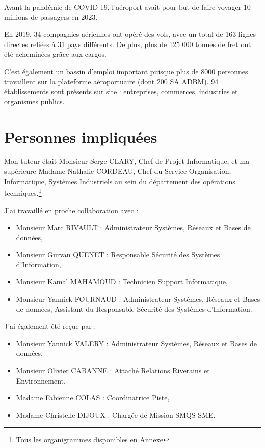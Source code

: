 Avant la pandémie de COVID-19, l'aéroport avait pour but de faire voyager 10 millions de passagers en 2023.

En 2019, 34 compagnies aériennes ont opéré des vols, avec un total de 163 lignes directes reliées à 31 pays différents.
De plus, plus de 125 000 tonnes de fret ont été acheminées grâce aux cargos.

C'est également un bassin d'emploi important puisque plus de 8000 personnes travaillent sur la plateforme aéroportuaire (dont 200 SA ADBM).
94 établissements sont présents sur site : entreprises, commerces, industries et organismes publics.

\section{Personnes impliquées}


Mon tuteur était Monsieur Serge CLARY, Chef de Projet Informatique, et ma supérieure Madame Nathalie CORDEAU, Chef du Service Organisation, Informatique, Systèmes Industriels au sein du département des opérations techniques.\footnote{Tous les organigrammes disponibles en Annexe}

J'ai travaillé en proche collaboration avec :

\begin{itemize}
    \item Monsieur Marc RIVAULT : Administrateur Systèmes, Réseaux et Bases de données,
    \item Monsieur Gurvan QUENET : Responsable Sécurité des Systèmes d'Information,
    \item Monsieur Kamal MAHAMOUD : Technicien Support Informatique,
    \item Monsieur Yannick FOURNAUD : Administrateur Systèmes, Réseaux et Bases de données, Assistant du Responsable Sécurité des Systèmes d'Information.\newline
\end{itemize}

J'ai également été reçue par :

\begin{itemize}
    \item Monsieur Yannick VALERY : Administrateur Systèmes, Réseaux et Bases de données,
    \item Monsieur Olivier CABANNE : Attaché Relations Riverains et Environnement,
    \item Madame Fabienne COLAS : Coordinatrice Piste,
    \item Madame Christelle DIJOUX : Chargée de Mission SMQS SME.
\end{itemize}


